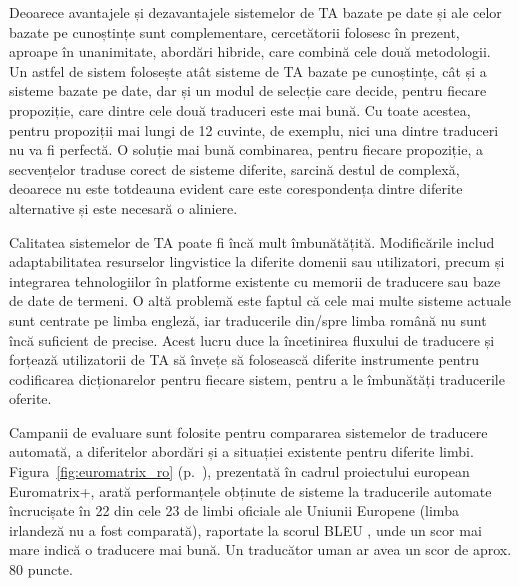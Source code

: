 \begin{multicols}{2}
Deoarece avantajele și dezavantajele sistemelor de TA bazate pe date și ale celor bazate pe cunoștințe sunt complementare, cercetătorii folosesc în prezent, aproape în unanimitate, abordări hibride, care combină cele două metodologii. Un astfel de sistem folosește atât sisteme de TA bazate pe cunoștințe, cât și a sisteme bazate pe date, dar și un modul de selecție care decide, pentru fiecare propoziție, care dintre cele două traduceri este mai bună. Cu toate acestea, pentru propoziții mai lungi de 12 cuvinte, de exemplu, nici una dintre traduceri nu va fi perfectă. O soluție mai bună combinarea, pentru fiecare propoziție, a secvențelor traduse corect de sisteme diferite, sarcină destul de complexă, deoarece nu este totdeauna evident care este corespondența dintre diferite alternative și este necesară o aliniere. 

Calitatea sistemelor de TA poate fi încă mult îmbunătățită. Modificările includ adaptabilitatea resurselor lingvistice la diferite domenii sau utilizatori, precum și integrarea tehnologiilor în platforme existente cu memorii de traducere sau baze de date de termeni. O altă problemă este faptul că cele mai multe sisteme actuale sunt centrate pe limba engleză, iar traducerile din/spre limba română nu sunt încă suficient de precise. Acest lucru duce la încetinirea fluxului de traducere și forțează utilizatorii de TA să învețe să folosească diferite instrumente pentru codificarea dicționarelor pentru fiecare sistem, pentru a le îmbunătăți traducerile oferite.

Campanii de evaluare sunt folosite pentru compararea sistemelor de traducere automată, a diferitelor abordări și a situației existente pentru diferite limbi. Figura~\ref{fig:euromatrix_ro} (p.~\pageref{fig:euromatrix_ro}), prezentată în cadrul proiectului european Euromatrix+, arată performanțele obținute de sisteme la traducerile automate încrucișate în 22 din cele 23 de limbi oficiale ale Uniunii Europene (limba irlandeză nu a fost comparată), raportate la scorul BLEU \cite{bleu1}, unde un scor mai mare indică o traducere mai bună. Un traducător uman ar avea un scor de aprox. 80 puncte.


\end{multicols}
